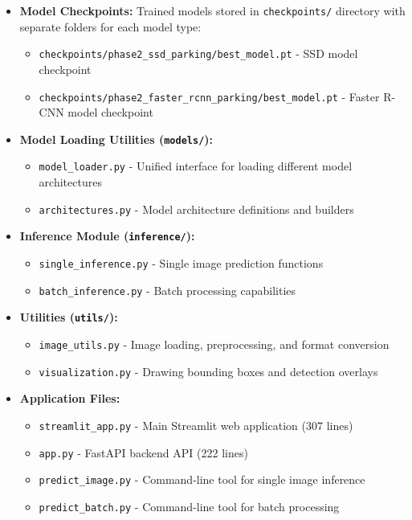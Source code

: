 \documentclass[12pt,a4paper]{article}
\begin{document}
\begin{itemize}
    \item \textbf{Model Checkpoints:} Trained models stored in \texttt{checkpoints/} directory with separate folders for each model type:
    \begin{itemize}
        \item \texttt{checkpoints/phase2\_ssd\_parking/best\_model.pt} - SSD model checkpoint
        \item \texttt{checkpoints/phase2\_faster\_rcnn\_parking/best\_model.pt} - Faster R-CNN model checkpoint
    \end{itemize}
    \item \textbf{Model Loading Utilities (\texttt{models/}):} 
    \begin{itemize}
        \item \texttt{model\_loader.py} - Unified interface for loading different model architectures
        \item \texttt{architectures.py} - Model architecture definitions and builders
    \end{itemize}
    \item \textbf{Inference Module (\texttt{inference/}):}
    \begin{itemize}
        \item \texttt{single\_inference.py} - Single image prediction functions
        \item \texttt{batch\_inference.py} - Batch processing capabilities
    \end{itemize}
    \item \textbf{Utilities (\texttt{utils/}):}
    \begin{itemize}
        \item \texttt{image\_utils.py} - Image loading, preprocessing, and format conversion
        \item \texttt{visualization.py} - Drawing bounding boxes and detection overlays
    \end{itemize}
    \item \textbf{Application Files:}
    \begin{itemize}
        \item \texttt{streamlit\_app.py} - Main Streamlit web application (307 lines)
        \item \texttt{app.py} - FastAPI backend API (222 lines)
        \item \texttt{predict\_image.py} - Command-line tool for single image inference
        \item \texttt{predict\_batch.py} - Command-line tool for batch processing

\end{itemize}
\end{itemize}
\end{document}
